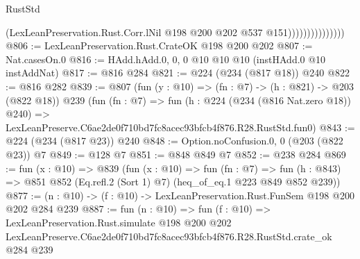 \begin{lexlean}{RustStd}
\begin{coremodule}
                                (LexLeanPreservation.Rust.Corr.lNil
                                  @198
                                  @200
                                  @202
                                  @537
                                  @151)))))))))))))))
@806 := LexLeanPreservation.Rust.CrateOK @198 @200 @202
@807 := Nat.casesOn.{0}
@816 := HAdd.hAdd.{0, 0, 0} @10 @10 @10 (instHAdd.{0} @10 instAddNat)
@817 := @816 @284
@821 := @224 (@234 (@817 @18)) @240
@822 := @816 @282
@839 := @807
    (fun (y : @10) => (fn : @7) -> (h : @821) -> @203 (@822 @18))
    @239
    (fun (fn : @7) =>
    fun (h : @224 (@234 (@816 Nat.zero @18)) @240) =>
    LexLeanPreserve.C6ae2de0f710bd7fc8acec93bfcb4f876.R28.RustStd.fun0)
@843 := @224 (@234 (@817 @23)) @240
@848 := Option.noConfusion.{0, 0} (@203 (@822 @23)) @7
@849 := @128 @7
@851 := @848 @849 @7
@852 := @238 @284
@869 := fun (x : @10) =>
  @839
    (fun (x : @10) =>
    fun (fn : @7) =>
    fun (h : @843) => @851 @852 (Eq.refl.{2} (Sort 1) @7) (heq_of_eq.{1} @223 @849 @852 @239))
@877 := (n : @10) -> (f : @10) -> LexLeanPreservation.Rust.FunSem @198 @200 @202 @284 @239
@887 := fun (n : @10) =>
  fun (f : @10) =>
  LexLeanPreservation.Rust.simulate
    @198
    @200
    @202
    LexLeanPreserve.C6ae2de0f710bd7fc8acec93bfcb4f876.R28.RustStd.crate_ok
    @284
    @239
\end{coremodule}
\end{lexlean}
